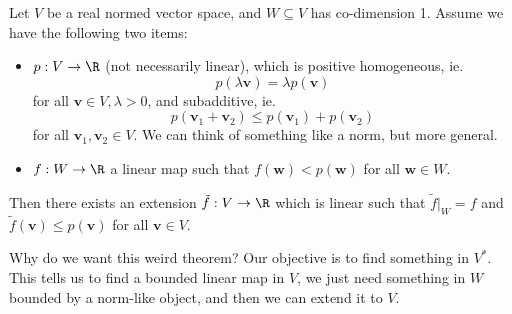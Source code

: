 \documentclass[a4paper]{article}
\begin{document}
\begin{prop}
  Let $V$ be a real normed vector space, and $W\subseteq V$ has co-dimension 1. Assume we have the following two items:
  \begin{itemize}
    \item $p: V \to \R$ (not necessarily linear), which is positive homogeneous, ie.
      \[
        p (\lambda \mathbf{v}) = \lambda p(\mathbf{v})
      \]
      for all $\mathbf{v}\in V, \lambda > 0$, and subadditive, ie.
      \[
        p(\mathbf{v}_1 + \mathbf{v}_2) \leq p (\mathbf{v}_1) + p(\mathbf{v}_2)
      \]
      for all $\mathbf{v}_1, \mathbf{v}_2 \in V$. We can think of something like a norm, but more general.
    \item $f: W \to \R$ a linear map such that $f(\mathbf{w}) < p (\mathbf{w})$ for all $\mathbf{w}\in W$.
  \end{itemize}
  Then there exists an extension $\tilde{f}: V\to \R$ which is linear such that $\tilde{f}|_{W} = f$ and $\tilde{f}(\mathbf{v}) \leq p(\mathbf{v})$ for all $\mathbf{v}\in V$.
\end{prop}
Why do we want this weird theorem? Our objective is to find something in $V^*$. This tells us to find a bounded linear map in $V$, we just need something in $W$ bounded by a norm-like object, and then we can extend it to $V$.
\end{document}
